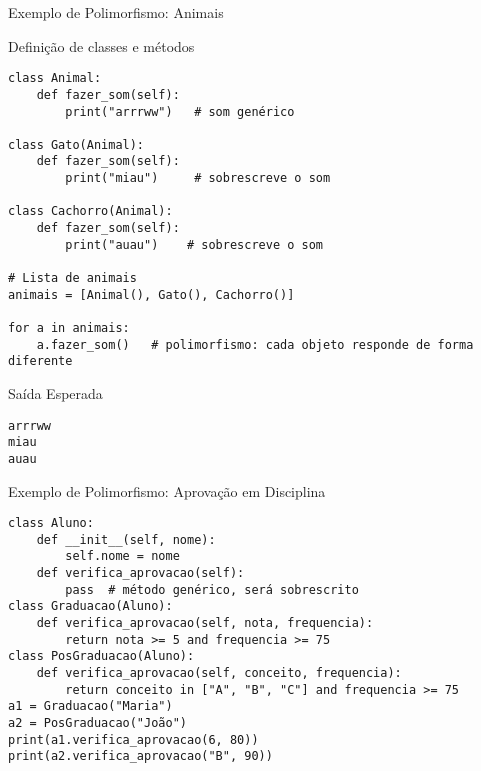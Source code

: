 \begin{frame}[fragile]{Exemplo de Polimorfismo: Animais}

    \begin{exampleblock}{Definição de classes e métodos}
        \begin{verbatim}
class Animal:
    def fazer_som(self):
        print("arrrww")   # som genérico

class Gato(Animal):
    def fazer_som(self):
        print("miau")     # sobrescreve o som

class Cachorro(Animal):
    def fazer_som(self):
        print("auau")    # sobrescreve o som

# Lista de animais
animais = [Animal(), Gato(), Cachorro()]

for a in animais:
    a.fazer_som()   # polimorfismo: cada objeto responde de forma diferente
\end{verbatim}
    \end{exampleblock}

    \begin{block}{Saída Esperada}
        \begin{verbatim}
arrrww
miau
auau
\end{verbatim}
    \end{block}

\end{frame}


\begin{frame}[fragile]{Exemplo de Polimorfismo: Aprovação em Disciplina}


    \begin{verbatim}
class Aluno:
    def __init__(self, nome):
        self.nome = nome
    def verifica_aprovacao(self):
        pass  # método genérico, será sobrescrito
class Graduacao(Aluno):
    def verifica_aprovacao(self, nota, frequencia):
        return nota >= 5 and frequencia >= 75
class PosGraduacao(Aluno):
    def verifica_aprovacao(self, conceito, frequencia):
        return conceito in ["A", "B", "C"] and frequencia >= 75
a1 = Graduacao("Maria")
a2 = PosGraduacao("João")
print(a1.verifica_aprovacao(6, 80))    
print(a2.verifica_aprovacao("B", 90))  
\end{verbatim}




\end{frame}

